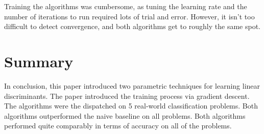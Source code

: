 \documentclass{amsart}
\begin{document}
    Training the algorithms was cumbersome, as tuning the learning rate
    and the number of iterations to run required lots of trial and error.
    However, it isn't too difficult to detect convergence, and both
    algorithms get to roughly the same spot.

    \section{Summary}
    In conclusion, this paper introduced two parametric techniques for
    learning linear discriminants. The paper introduced the training
    process via gradient descent. The algorithms were the dispatched
    on 5 real-world classification problems. Both algorithms outperformed
    the naive baseline on all problems. Both algorithms performed
    quite comparably in terms of accuracy on all of the problems.



\end{document}
